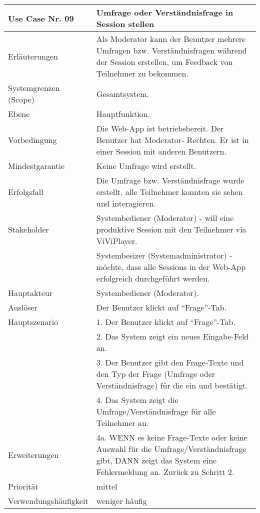\begin{tabularx}{\linewidth}{|l|X|}
	\hline
	Use Case Nr. 09			& \textbf{Umfrage oder Verständnisfrage in Session stellen} \\ \hline
	Erläuterungen			& Als Moderator kann der Benutzer mehrere Umfragen bzw. Verständnisfragen
							  während der Session erstellen, um Feedback von Teilnehmer zu bekommen. \\ \hline
	Systemgrenzen (Scope)	& Gesamtsystem. \\ \hline
	Ebene					& Hauptfunktion. \\ \hline
	Vorbedingung			& Die Web-App ist betriebsbereit. Der Benutzer hat Moderator-
							  Rechten. Er ist in einer Session mit anderen Benutzern. \\ \hline
	Mindestgarantie			& Keine Umfrage wird erstellt. \\ \hline
	Erfolgsfall 			& Die Umfrage bzw. Verständnisfrage wurde erstellt, alle Teilnehmer konnten sie sehen 
	                          und interagieren. \\ \hline
	Stakeholder				& Systembediener (Moderator) - will eine produktive Session mit den 
							  Teilnehmer via ViViPlayer. \\
							& Systembesizer (Systemadministrator) - möchte, dass alle Sessions in der
							  Web-App erfolgreich durchgeführt werden. \\ \hline
	Hauptakteur				& Systembediener (Moderator). \\ \hline
	Auslöser				& Der Benutzer klickt auf ``Frage''-Tab. \\ \hline	
	Hauptszenario			& 1. Der Benutzer klickt auf ``Frage''-Tab. \\
							& 2. Das System zeigt ein neues Eingabe-Feld an. \\ 
							& 3. Der Benutzer gibt den Frage-Texte und den Typ der Frage (Umfrage
							  oder Verständnisfrage) für die ein und bestätigt. \\
							& 4. Das System zeigt die Umfrage/Verständnisfrage für alle Teilnehmer an. \\ \hline
	Erweiterungen			& 4a. WENN es keine Frage-Texte oder keine Auswahl für die 
							  Umfrage/Verständnisfrage gibt, DANN zeigt das System eine Fehlermeldung an. Zurück zu Schritt 2. \\ \hline
	Priorität				& mittel \\ \hline
	Verwendungshäufigkeit	& weniger häufig \\ \hline
\end{tabularx}